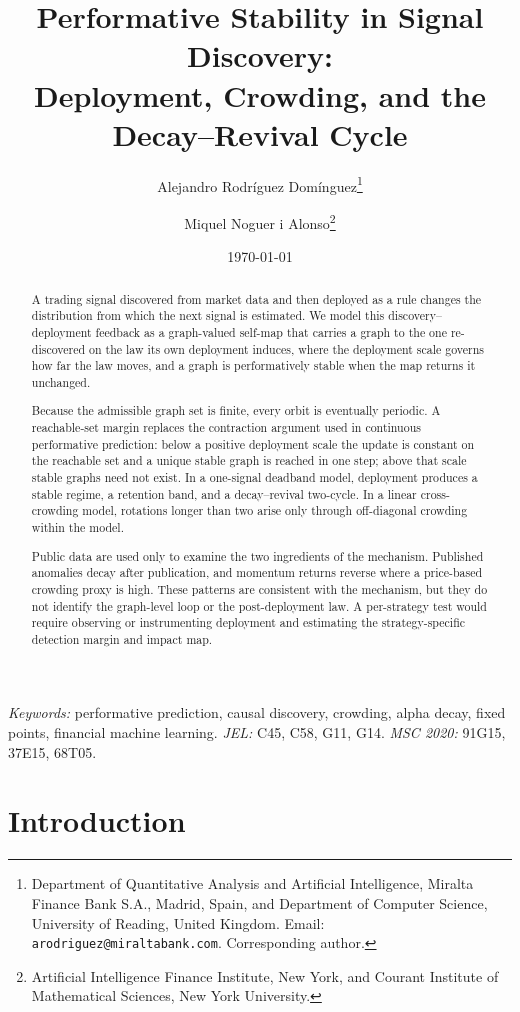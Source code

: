 \documentclass[11pt]{article}
\title{\textbf{Performative Stability in Signal Discovery:\\
Deployment, Crowding, and the Decay--Revival Cycle}}
\author{%
Alejandro Rodr\'iguez Dom\'inguez\thanks{Department of Quantitative Analysis and Artificial Intelligence, Miralta Finance Bank S.A., Madrid, Spain, and Department of Computer Science, University of Reading, United Kingdom. Email: \texttt{arodriguez@miraltabank.com}. Corresponding author.}
\and
Miquel Noguer i Alonso\thanks{Artificial Intelligence Finance Institute, New York, and Courant Institute of Mathematical Sciences, New York University.}}
\date{\today}
\theoremstyle{plain}
\theoremstyle{definition}
\begin{document}
\maketitle

\begin{abstract}
\noindent
A trading signal discovered from market data and then deployed as a rule changes the distribution from which the next signal is estimated. We model this discovery--deployment feedback as a graph-valued self-map that carries a graph to the one re-discovered on the law its own deployment induces, where the deployment scale governs how far the law moves, and a graph is performatively stable when the map returns it unchanged.

Because the admissible graph set is finite, every orbit is eventually periodic. A reachable-set margin replaces the contraction argument used in continuous performative prediction: below a positive deployment scale the update is constant on the reachable set and a unique stable graph is reached in one step; above that scale stable graphs need not exist. In a one-signal deadband model, deployment produces a stable regime, a retention band, and a decay--revival two-cycle. In a linear cross-crowding model, rotations longer than two arise only through off-diagonal crowding within the model.

Public data are used only to examine the two ingredients of the mechanism. Published anomalies decay after publication, and momentum returns reverse where a price-based crowding proxy is high. These patterns are consistent with the mechanism, but they do not identify the graph-level loop or the post-deployment law. A per-strategy test would require observing or instrumenting deployment and estimating the strategy-specific detection margin and impact map.
\end{abstract}

\medskip
\noindent\textit{Keywords:} performative prediction, causal discovery, crowding, alpha decay, fixed points, financial machine learning. \quad \textit{JEL:} C45, C58, G11, G14. \quad \textit{MSC 2020:} 91G15, 37E15, 68T05.

\bigskip

\section{Introduction}\label{sec:intro}
\end{document}

